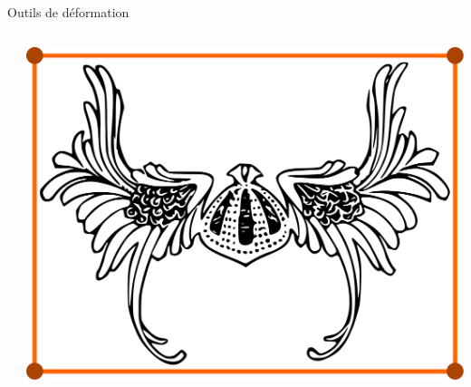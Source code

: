 \documentclass[xcolor=x11names,compress]{beamer}
\renewcommand{\(}{\begin{columns}} \renewcommand{\)}{\end{columns}}
\newcommand{\<}[1]{\begin{column}{#1}} \renewcommand{\>}{\end{column}}
\begin{document}
\begin{frame}{Outils de déformation}
\begin{columns}[t]
\begin{column}{0.25\textwidth}
    \end{column}
    \begin{column}{0.4\textwidth}
      \centering
      \includegraphics[scale=0.13]{Outil-Mono-Surfaces}
    \end{column}
  \end{columns} 
\end{frame}
\end{document}
